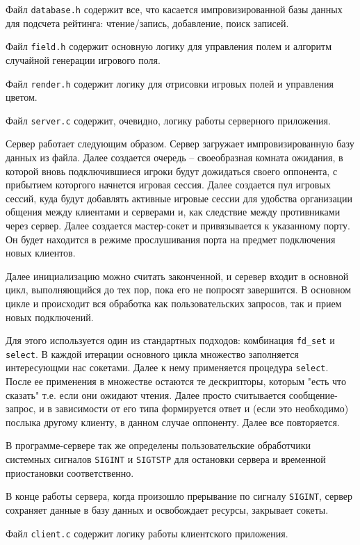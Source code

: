 \documentclass[12pt]{article}
\begin{document}
Файл \verb|database.h| содержит все, что касается импровизированной базы данных для подсчета рейтинга: чтение/запись, добавление, поиск записей.

Файл \verb|field.h| содержит основную логику для управления полем и алгоритм случайной генерации игрового поля.

Файл \verb|render.h| содержит логику для отрисовки игровых полей и управления цветом.

Файл \verb|server.c| содержит, очевидно, логику работы серверного приложения.

Сервер работает следующим образом. Сервер загружает импровизированную базу данных из файла. Далее создается очередь -- своеобразная комната ожидания, в которой вновь подключившиеся игроки будут дожидаться своего оппонента, с прибытием которгого начнется игровая сессия. Далее создается пул игровых сессий, куда будут добавлять активные игровые сессии для удобства организации общения между клиентами и серверами и, как следствие между противниками через сервер. Далее создается мастер-сокет и привязывается к указанному порту. Он будет находится в режиме прослушивания порта на предмет подключения новых клиентов.

Далее инициализацию можно считать законченной, и серевер входит в основной цикл, выполняющийся до тех пор, пока его не попросят завершится.
В основном цикле и происходит вся обработка как пользовательских запросов, так и прием новых подключений.

Для этого используется один из стандартных подходов: комбинация \verb|fd_set| и \verb|select|. В каждой итерации основного цикла множество заполняется интересующми нас сокетами. Далее к нему применяется процедура \verb|select|. После ее применения в множестве остаются те дескрипторы, которым "есть что сказать" т.е. если они ожидают чтения. Далее просто считывается сообщение-запрос, и в зависимости от его типа формируется ответ и (если это необходимо) послыка другому клиенту, в данном случае оппоненту.
Далее все повторяется.

В программе-сервере так же определены пользовательские обработчики системных сигналов \verb|SIGINT| и \verb|SIGTSTP| для остановки сервера и временной приостановки соответственно.

В конце работы сервера, когда произошло прерывание по сигналу  \verb|SIGINT|, сервер сохраняет данные в базу данных и освобождает ресурсы, закрывает сокеты. 

Файл \verb|client.c| содержит логику работы клиентского приложения.
\end{document}
